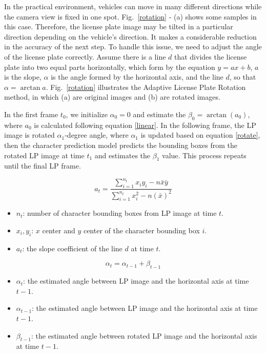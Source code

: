 \documentclass[conference]{IEEEtran}
\begin{document}
In the practical environment, vehicles can move in many different directions while the camera view is fixed in one spot. Fig.~\ref{rotation} - (a) shows some samples in this case. Therefore, the license plate image may be tilted in a particular direction depending on the vehicle's direction. It makes a considerable reduction in the accuracy of the next step. To handle this issue, we need to adjust the angle of the license plate correctly. Assume there is a line $d$ that divides the license plate into two equal parts horizontally, which form by the equation $y=ax+b$, $a$ is the slope, $\alpha$ is the angle formed by the horizontal axis, and the line $d$, so that $\alpha=\arctan{a}$. Fig.~\ref{rotation} illustrates the Adaptive License Plate Rotation method, in which (a) are original images and (b) are rotated images. 

In the first frame $t_0$, we initialize $\alpha_0=0$ and estimate the $\beta_0 = \arctan({a_0})$, where $a_0$ is calculated following equation \eqref{linear}. In the following frame, the LP image is rotated $\alpha_1$-degree angle, where $\alpha_1$ is updated based on equation \eqref{rotate}, then the character prediction model predicts the bounding boxes from the rotated LP image at time $t_1$ and estimates the $\beta_1$ value. This process repeats until the final LP frame. 

\begin{equation}
\label{linear}
    a_t =\frac{\sum_{i=1}^{n_t} x_i y_i - n \bar{x} \bar{y}}{\sum_{i=1}^{n_t} x^2_i-n(\bar{x})^2}
\end{equation}
\begin{itemize}[where:]
    \item $n_t$: number of character bounding boxes from LP image at time $t$.
    \item $x_i, y_i$: $x$ center and $y$ center of the character bounding box $i$.
    \item $a_t$: the slope coefficient of the line $d$ at time $t$.
\end{itemize}


\begin{equation}
\label{rotate}
\alpha_t=\alpha_{t-1}+\beta_{t-1}
\end{equation}
\begin{itemize}[where:]
    \item $\alpha_{t}$: the estimated angle between LP image and the horizontal axis at time $t-1$.
    \item $\alpha_{t-1}$: the estimated angle between LP image and the horizontal axis at time $t-1$.
    \item $\beta_{t-1}$: the estimated angle between rotated LP image and the horizontal axis at time $t-1$.
\end{itemize}
\end{document}
